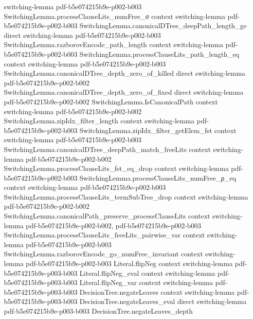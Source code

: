 \begin{lemma}
  {switching-lemma}
  {pdf-b5e074215b9e-p002-b003}
\proofstep
  {SwitchingLemma.processClauseLits_numFree_σ}
  {context}
  {switching-lemma}
  {pdf-b5e074215b9e-p002-b003}
\proofstep
  {SwitchingLemma.canonicalDTree_deepPath_length_ge}
  {direct}
  {switching-lemma}
  {pdf-b5e074215b9e-p002-b003}
\proofstep
  {SwitchingLemma.razborovEncode_path_length}
  {context}
  {switching-lemma}
  {pdf-b5e074215b9e-p002-b003}
\proofstep
  {SwitchingLemma.processClauseLits_path_length_eq}
  {context}
  {switching-lemma}
  {pdf-b5e074215b9e-p002-b003}
\proofstep
  {SwitchingLemma.canonicalDTree_depth_zero_of_killed}
  {direct}
  {switching-lemma}
  {pdf-b5e074215b9e-p002-b002}
\proofstep
  {SwitchingLemma.canonicalDTree_depth_zero_of_fixed}
  {direct}
  {switching-lemma}
  {pdf-b5e074215b9e-p002-b002}
\proofstep
  {SwitchingLemma.IsCanonicalPath}
  {context}
  {switching-lemma}
  {pdf-b5e074215b9e-p002-b002}
\proofstep
  {SwitchingLemma.zipIdx_filter_length}
  {context}
  {switching-lemma}
  {pdf-b5e074215b9e-p002-b003}
\proofstep
  {SwitchingLemma.zipIdx_filter_getElem_fst}
  {context}
  {switching-lemma}
  {pdf-b5e074215b9e-p002-b003}
\proofstep
  {SwitchingLemma.canonicalDTree_deepPath_match_freeLits}
  {context}
  {switching-lemma}
  {pdf-b5e074215b9e-p002-b002}
\proofstep
  {SwitchingLemma.processClauseLits_fst_eq_drop}
  {context}
  {switching-lemma}
  {pdf-b5e074215b9e-p002-b003}
\proofstep
  {SwitchingLemma.processClauseLits_numFree_ρ_eq}
  {context}
  {switching-lemma}
  {pdf-b5e074215b9e-p002-b003}
\proofstep
  {SwitchingLemma.processClauseLits_termSubTree_drop}
  {context}
  {switching-lemma}
  {pdf-b5e074215b9e-p002-b002}
\proofstep
  {SwitchingLemma.canonicalPath_preserve_processClauseLits}
  {context}
  {switching-lemma}
  {pdf-b5e074215b9e-p002-b002,
    pdf-b5e074215b9e-p002-b003}
\proofstep
  {SwitchingLemma.processClauseLits_freeLits_pairwise_var}
  {context}
  {switching-lemma}
  {pdf-b5e074215b9e-p002-b003}
\proofstep
  {SwitchingLemma.razborovEncode_go_numFree_invariant}
  {context}
  {switching-lemma}
  {pdf-b5e074215b9e-p002-b003}
\proofstep
  {Literal.flipNeg}
  {context}
  {switching-lemma}
  {pdf-b5e074215b9e-p003-b003}
\proofstep
  {Literal.flipNeg_eval}
  {context}
  {switching-lemma}
  {pdf-b5e074215b9e-p003-b003}
\proofstep
  {Literal.flipNeg_var}
  {context}
  {switching-lemma}
  {pdf-b5e074215b9e-p003-b003}
\proofstep
  {DecisionTree.negateLeaves}
  {context}
  {switching-lemma}
  {pdf-b5e074215b9e-p003-b003}
\proofstep
  {DecisionTree.negateLeaves_eval}
  {direct}
  {switching-lemma}
  {pdf-b5e074215b9e-p003-b003}
\proofstep
  {DecisionTree.negateLeaves_depth}

\end{lemma}
